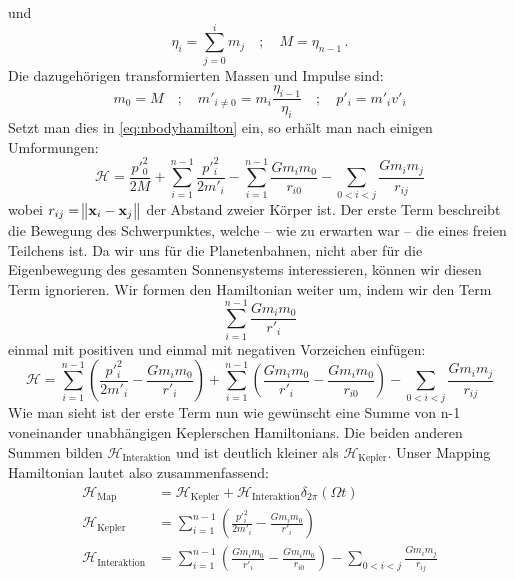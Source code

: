 \documentclass[12pt,a4paper,twoside]{article}
\renewcommand{\vec}{\mathbf}
\renewcommand{\H}{\mathcal H}
\begin{document}
und
\begin{equation}
\eta_i = \sum\limits_{j=0}^{i} m_j \quad ; \quad M = \eta_{n-1}\,.
\end{equation}
Die dazugehörigen transformierten Massen und Impulse sind:
\begin{equation}
m_0 = M \quad ; \quad m'_{i\neq 0} = m_i \frac{\eta_{i-1}}{\eta_{i}} \quad ; \quad p'_i = m'_i v'_i
\end{equation}
Setzt man dies in \ref{eq:nbodyhamilton} ein, so erhält man nach einigen Umformungen: %
\begin{equation}
\H = \frac{p'^2_0}{2M} + \sum\limits_{i=1}^{n-1} \frac{p'^2_i}{2m'_i} - \sum\limits_{i=1}^{n-1} \frac{Gm_im_0}{r_{i0}} - \sum\limits_{0<i<j} \frac{Gm_im_j}{r_{ij}}
\end{equation}
wobei $r_{ij}=\norm{\vec{x}_i-\vec{x}_j}$ der Abstand zweier Körper ist. Der erste Term beschreibt die Bewegung des Schwerpunktes, welche – wie zu erwarten war – die eines freien Teilchens ist. Da wir uns für die Planetenbahnen, nicht aber für die Eigenbewegung des gesamten Sonnensystems interessieren, können wir diesen Term ignorieren.
Wir formen den Hamiltonian weiter um, indem wir den Term
\begin{equation}
\sum\limits_{i=1}^{n-1} \frac{Gm_im_0}{r'_i}
\end{equation}
einmal mit positiven und einmal mit negativen Vorzeichen einfügen:
\begin{equation}
\H = \sum\limits_{i=1}^{n-1} \left( \frac{p'^2_i}{2m'_i} - \frac{Gm_im_0}{r'_i} \right)
  +  \sum\limits_{i=1}^{n-1} \left( \frac{Gm_im_0}{r'_i} - \frac{Gm_im_0}{r_{i0}} \right)
  -  \sum\limits_{0<i<j} \frac{Gm_im_j}{r_{ij}}
\end{equation}
Wie man sieht ist der erste Term nun wie gewünscht eine Summe von n-1 voneinander unabhängigen Keplerschen Hamiltonians. Die beiden anderen Summen bilden $\H_{\mathrm{Interaktion}}$ und ist deutlich kleiner als $\H_{\mathrm{Kepler}}$. Unser Mapping Hamiltonian lautet also zusammenfassend:
\begin{align}
\H_{\mathrm{Map}} &= \H_{\mathrm{Kepler}} + \H_{\mathrm{Interaktion}}\delta_{2\pi}(\Omega t) \\
\H_{\mathrm{Kepler}} &= \sum\limits_{i=1}^{n-1} \left( \frac{p'^2_i}{2m'_i} - \frac{Gm_im_0}{r'_i} \right) \\
\H_{\mathrm{Interaktion}} &= \sum\limits_{i=1}^{n-1} \left( \frac{Gm_im_0}{r'_i} - \frac{Gm_im_0}{r_{i0}} \right)
  -  \sum\limits_{0<i<j} \frac{Gm_im_j}{r_{ij}}
\end{align}
\end{document}
